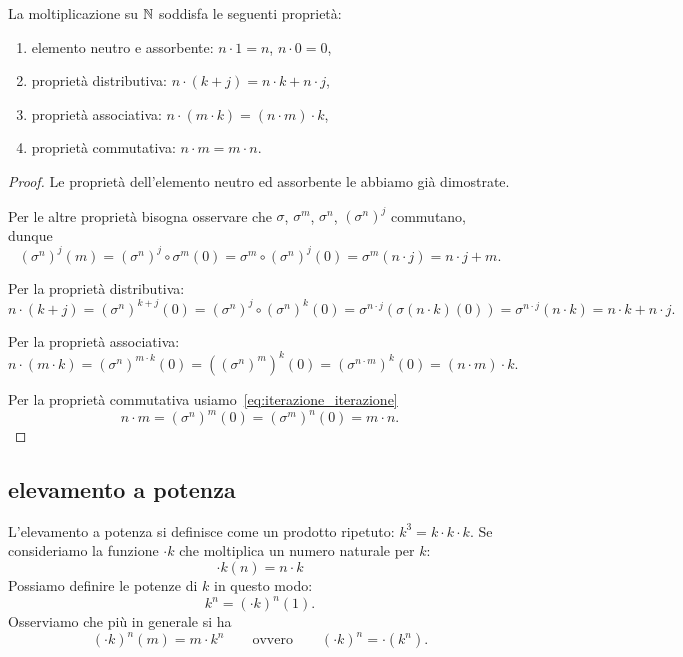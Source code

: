 \begin{theorem}
La moltiplicazione su ${\mathbb N}$ soddisfa le seguenti proprietà:
\begin{enumerate}
  \item elemento neutro e assorbente: $n\cdot 1=n$, $n\cdot 0=0$,
  \item proprietà distributiva: $n\cdot(k+j) = n\cdot k + n\cdot j$,
  \item proprietà associativa: $n\cdot(m\cdot k) = (n\cdot m)\cdot k$,
  \item proprietà commutativa: $n\cdot m = m\cdot n$.
\end{enumerate}
\end{theorem}
\begin{proof}
Le proprietà dell'elemento neutro ed assorbente le abbiamo già 
dimostrate.

Per le altre proprietà bisogna osservare che 
$\sigma$, $\sigma^m$, $\sigma^n$, $(\sigma^n)^j$ commutano,
dunque
\[
  (\sigma^n)^j(m) 
  = (\sigma^n)^j\circ \sigma^m (0)
  = \sigma^m \circ (\sigma^n)^j (0)
  = \sigma^m(n\cdot j)
  = n\cdot j + m.
\]

Per la proprietà distributiva:
\[
n\cdot (k+j)  
= (\sigma^n)^{k+j}(0)
= (\sigma^n)^j \circ (\sigma^n)^k(0)
= \sigma^{n\cdot j}(\sigma(n\cdot k)(0))
= \sigma^{n\cdot j}(n\cdot k)
= n \cdot k + n\cdot j.
\]

Per la proprietà associativa:
\[
n\cdot (m\cdot k)
= (\sigma^n)^{m\cdot k}(0)
= ((\sigma^n)^m)^k(0)
= (\sigma^{n\cdot m})^k(0)
= (n\cdot m)\cdot k.
\]

Per la proprietà commutativa usiamo~\eqref{eq:iterazione_iterazione}
\[
  n\cdot m
  = (\sigma^n)^m(0) 
  = (\sigma^m)^n(0)
  = m\cdot n. 
\]
\end{proof}

\subsection{elevamento a potenza}

L'elevamento a potenza si definisce come un prodotto ripetuto: 
$k^3 = k\cdot k\cdot k$.
Se consideriamo la funzione $\cdot k$ 
che moltiplica un numero naturale per $k$:
\[
 \cdot k(n) = n\cdot k  
\]
Possiamo definire le potenze di $k$ in questo modo:
\[
   k^n = (\cdot k)^n(1).  
\]
Osserviamo che più in generale si ha 
\begin{equation}\label{eq:3954820}
  (\cdot k)^n(m) = m\cdot k^n
  \qquad\text{ovvero}\qquad
 (\cdot k)^n = \cdot(k^n).
\end{equation}


